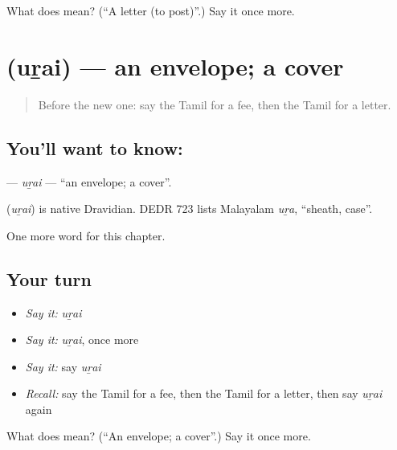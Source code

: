 \begin{tcolorbox}[breakable,colback=teal!4,colframe=teal!35!black,title={Before you move on}]
What does  mean? (\textquotedblleft{}A letter (to post)\textquotedblright{}.) Say it once more.
\end{tcolorbox}
\section[\texorpdfstring{\ta{உறை} (uṟai)}{உறை (uṟai)}]{ (uṟai) — an envelope; a cover}

\label{lesson:TA-C215-urai}



\begin{quote}
Before the new one: say the Tamil for a fee, then the Tamil for a letter.
\end{quote}

\subsection*{You'll want to know: }
\textbf{} — \emph{uṟai} — \textquotedblleft{}an envelope; a cover\textquotedblright{}.

\begin{cousinweb}
\textbf{} (\emph{uṟai}) is native Dravidian. DEDR 723 lists Malayalam \emph{uṟa}, \textquotedblleft{}sheath, case\textquotedblright{}.
\end{cousinweb}

\begin{grammarlens}[title={What you've built}]
One more word for this chapter.
\end{grammarlens}

\subsection*{Your turn}
\begin{itemize}
\raggedright
  \item \emph{Say it:} \emph{uṟai}
  \item \emph{Say it:} \emph{uṟai}, once more
  \item \emph{Say it:} say \emph{uṟai}
  \item \emph{Recall:} say the Tamil for a fee, then the Tamil for a letter, then say \emph{uṟai} again
\end{itemize}

\begin{tcolorbox}[breakable,colback=teal!4,colframe=teal!35!black,title={Before you move on}]
What does  mean? (\textquotedblleft{}An envelope; a cover\textquotedblright{}.) Say it once more.
\end{tcolorbox}
